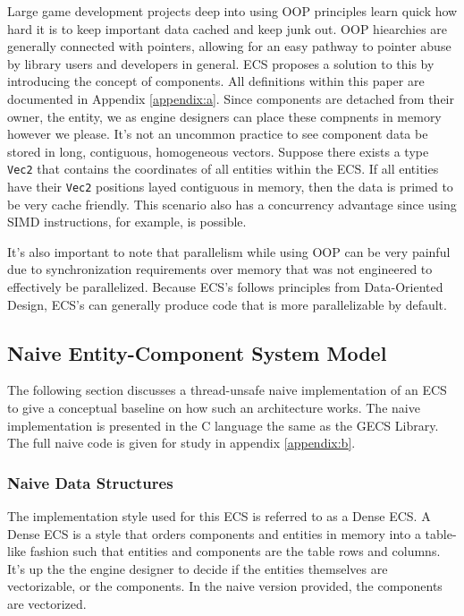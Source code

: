 Large game development projects deep into using OOP principles learn quick how hard it is to keep important data cached and keep junk out. OOP hiearchies are generally connected with pointers, allowing for an easy pathway to pointer abuse by library users and developers in general. ECS proposes a solution to this by introducing the concept of components. All definitions within this paper are documented in Appendix \ref{appendix:a}. Since components are detached from their owner, the entity, we as engine designers can place these compnents in memory however we please. It's not an uncommon practice to see component data be stored in long, contiguous, homogeneous vectors. Suppose there exists a type \texttt{Vec2} that contains the coordinates of all entities within the ECS. If all entities have their \texttt{Vec2} positions layed contiguous in memory, then the data is primed to be very cache friendly. \cite{Wiebusch2012}\cite{SanderMertensECS} This scenario also has a concurrency advantage since using SIMD instructions, for example, is possible. 

It's also important to note that parallelism while using OOP can be very painful due to synchronization requirements over memory that was not engineered to effectively be parallelized. Because ECS's follows principles from Data-Oriented Design, ECS's can generally produce code that is more parallelizable by default.\cite{RomeoPHD}

\subsection{Naive Entity-Component System Model}
\label{sec:ecs_naive}
The following section discusses a thread-unsafe naive implementation of an ECS to give a conceptual baseline on how such an architecture works. The naive implementation is presented in the C language the same as the GECS Library. The full naive code is given for study in appendix \ref{appendix:b}.

\subsubsection{Naive Data Structures}
The implementation style used for this ECS is referred to as a Dense ECS. \cite{EnTT_SparseSets} A Dense ECS is a style that orders components and entities in memory into a table-like fashion such that entities and components are the table rows and columns. It's up the the engine designer to decide if the entities themselves are vectorizable, or the components. In the naive version provided, the components are vectorized. 


